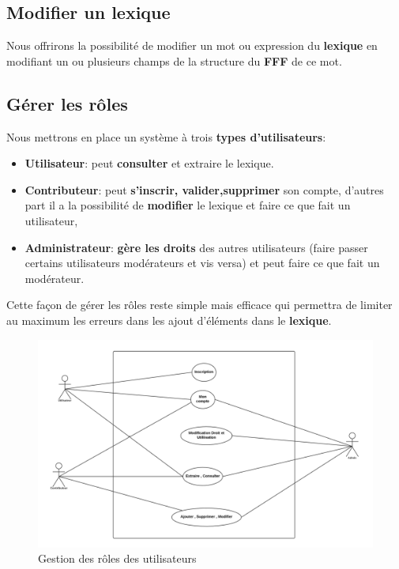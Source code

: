 \subsection{Modifier un lexique}
 
{Nous offrirons la possibilité de modifier un mot ou expression du \textbf{lexique} en modifiant un ou plusieurs champs de la structure du \textbf{FFF} de ce mot.\par}
 
\subsection{Gérer les rôles}
Nous mettrons en place un système à trois \textbf{types d'utilisateurs}:
\begin{itemize}
\item \textbf{Utilisateur}:  peut \textbf{consulter} et extraire le lexique.
\item \textbf{Contributeur}: peut \textbf{s'inscrir, valider,supprimer} son compte, d'autres part il a la possibilité de \textbf{modifier} le lexique et faire ce que fait un utilisateur,
\item \textbf{Administrateur}: \textbf{gère les droits} des autres utilisateurs (faire passer certains utilisateurs modérateurs et vis versa) et peut faire ce que fait un modérateur.
\end{itemize}
{Cette façon de gérer les rôles reste simple mais efficace qui permettra de limiter au maximum les erreurs dans les ajout d'éléments dans le \textbf{lexique}.\par}

\begin{figure}[ht]
    \centering
    \includegraphics[scale=0.3]{uml.png}
    \caption{Gestion des rôles des utilisateurs }
\end{figure}


